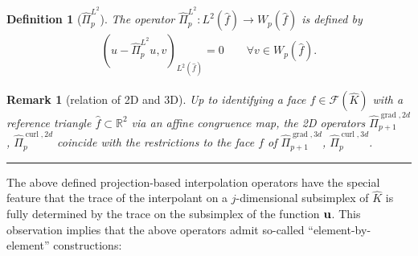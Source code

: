 \documentclass{article}
\newtheorem{definition}[theorem]{Definition}
\newtheorem{remark}[theorem]{Remark}
\newcommand{\hatPicurlcom}{\widehat \Pi^{\operatorname*{curl},3d}_p}
\newcommand{\hatPicurlcomtwod}{\widehat \Pi^{\operatorname*{curl},2d}_p}
\newcommand{\hatPigradcom}{\widehat\Pi^{\operatorname*{grad},3d}_{p+1}}
\newcommand{\hatPigradcomtwod}{\widehat\Pi^{\operatorname*{grad},2d}_{p+1}}
\newcommand{\eremk}{\hbox{}\hfill\rule{0.8ex}{0.8ex}}
\begin{document}
\begin{definition}[$\widehat{\Pi}_p^{L^2}$]
The operator $\widehat{\Pi}_p^{L^2}:L^{2}(\widehat{f}) \rightarrow W_p(\widehat{f})$ is defined by
\begin{align}
(u-\widehat{\Pi}_p^{L^2}u,v)_{L^2(\widehat{f})} = 0 \qquad \forall v\in W_p(\widehat{f}).
\end{align}
\end{definition}

\begin{remark}
[relation of 2D and 3D]
Up to identifying a face $f \in {\mathcal F}(\widehat K)$ with a reference
triangle $\widehat f \subset {\mathbb R}^2$ via an affine \emph{congruence} map, 
the 2D operators $\hatPigradcomtwod$, $\hatPicurlcomtwod$ coincide with the 
restrictions to the face $f$ of $\hatPigradcom$, $\hatPicurlcom$.
%
\eremk
\end{remark}

The above defined projection-based interpolation operators have the special
feature that the trace of the interpolant on a $j$-dimensional subsimplex of $\widehat K$
is fully determined by the trace on the subsimplex of the function ${\bf u}$. This observation
implies that the above operators admit so-called ``element-by-element''
constructions: 
\end{document}
